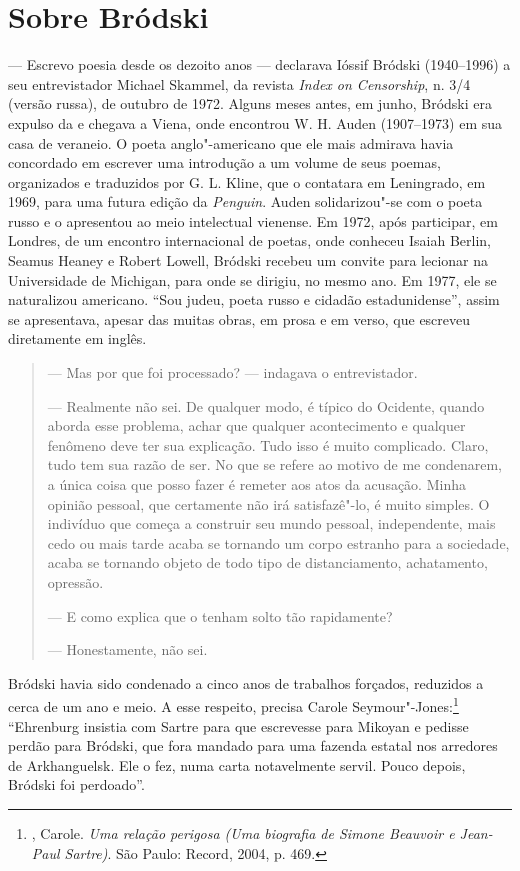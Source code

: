 \chapter{Sobre Bródski}

--- Escrevo poesia desde os dezoito anos --- declarava Ióssif Bródski
(1940--1996) a seu entrevistador Michael Skammel, da revista \emph{Index
on Censorship}, n. 3/4 (versão russa), de outubro de 1972. Alguns meses
antes, em junho, Bródski era expulso da  e chegava a Viena, onde
encontrou W. H. Auden (1907--1973) em sua casa de veraneio. O poeta
anglo"-americano que ele mais admirava havia concordado em escrever
uma introdução a um volume de seus poemas, organizados e traduzidos por
G. L. Kline, que o contatara em Leningrado, em 1969, para uma
futura edição da \emph{Penguin}. Auden solidarizou"-se com o poeta russo e o apresentou ao
meio intelectual vienense. Em 1972, após participar, em Londres, de um
encontro internacional de poetas, onde conheceu Isaiah Berlin, Seamus
Heaney e Robert Lowell, Bródski recebeu um convite para lecionar na
Universidade de Michigan, para onde se dirigiu, no mesmo ano. Em
1977, ele se naturalizou americano. ``Sou judeu, poeta russo e cidadão
estadunidense'', assim se apresentava, apesar das muitas obras, em
prosa e em verso, que escreveu diretamente em inglês.

\begin{quotation}
--- Mas por que foi processado? --- indagava o entrevistador.

--- Realmente não sei. De qualquer modo, é típico do Ocidente, quando
aborda esse problema, achar que qualquer acontecimento e qualquer
fenômeno deve ter sua explicação. Tudo isso é muito complicado. Claro,
tudo tem sua razão de ser. No que se refere ao motivo de me condenarem, a
única coisa que posso fazer é remeter aos atos da acusação. Minha
opinião pessoal, que certamente não irá satisfazê"-lo, é muito simples. O
indivíduo que começa a construir seu mundo pessoal, independente, mais
cedo ou mais tarde acaba se tornando um corpo estranho para a sociedade,
acaba se tornando objeto de todo tipo de distanciamento, achatamento,
opressão.

--- E como explica que o tenham solto tão rapidamente?

--- Honestamente, não sei.
\end{quotation}

Bródski havia sido condenado a cinco anos de trabalhos forçados,
reduzidos a cerca de um ano e meio. A esse respeito, precisa Carole
Seymour"-Jones:\footnote{, Carole. \emph{Uma
 relação perigosa (Uma biografia de Simone Beauvoir e Jean-Paul Sartre)}. São Paulo: Record, 2004, p. 469.} ``Ehrenburg
insistia com Sartre para que escrevesse para Mikoyan e pedisse perdão
para Bródski, que fora mandado para uma fazenda estatal nos arredores de
Arkhanguelsk. Ele o fez, numa carta notavelmente servil. Pouco depois,
Bródski foi perdoado''.

